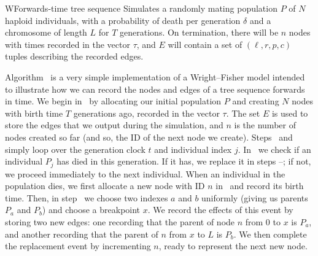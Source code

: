 \documentclass{article}
\begin{document}
\begin{taocpalg}{W}{Forwards-time tree sequence}
{Simulates a randomly mating population $P$ of $N$ haploid individuals,
with a probability of death per generation $\delta$ and a chromosome of length
$L$ for $T$ generations. On termination, there will be $n$ nodes with times recorded
in the vector $\tau$, and $E$ will contain a set of $(\ell, r, p, c)$ tuples
describing the recorded edges.
}




\algstep{W4.}{Mortality.}{ If $\randomuniform([0, 1)) \geq \delta$ go to \algref{W8}.
}


\algstep{W6.}{Choose parents.}{Set $a \leftarrow \randomuniform(\{0, \dots, n - 1\})$,
    $b \leftarrow \randomuniform(\{0, \dots, n - 1\})$ and $x \leftarrow \randomuniform([0, L))$.
}




\end{taocpalg}

Algorithm~ is a very simple implementation of a Wright--Fisher model
intended to illustrate how we can record the nodes and edges of a tree sequence
forwards in time. We begin in~ by allocating our initial population $P$
and creating $N$ nodes with birth time $T$ generations ago, recorded in the
vector $\tau$. The set $E$ is used to store the edges that we output during the
simulation, and $n$ is the number of nodes created so far (and so, the ID of
the next node we create). Steps~ and~ simply loop over
the generation clock $t$ and individual index $j$. In~ we check if
an individual $P_j$ has died in this generation. If it has, we replace it in
steps --; if not, we proceed immediately to the next
individual. When an individual in the population dies, we first allocate
a new node with ID $n$ in~ and record its birth time. Then,
in step~ we choose two indexes $a$ and $b$ uniformly (giving us
parents $P_a$ and $P_b$) and choose a breakpoint $x$. We record the effects of this
event by storing two new edges: one recording that the parent of node $n$
from $0$ to $x$ is $P_a$, and another recording that the parent of $n$
from $x$ to $L$ is $P_b$. We then complete the replacement event by incrementing
$n$, ready to represent the next new node.
\end{document}
